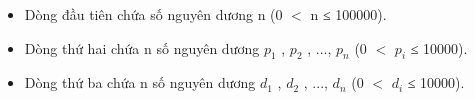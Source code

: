 \begin{itemize}
	\item     Dòng đầu tiên chứa số nguyên dương n (0 $<$ n ≤ 100000).   
	\item     Dòng thứ hai chứa n số nguyên dương $p_{1}$    , $p_{2}$    , ..., $p_{n}$    (0 $<$ $p_{i}$    ≤ 10000).   
	\item     Dòng thứ ba chứa n số nguyên dương $d_{1}$    , $d_{2}$    , ..., $d_{n}$    (0 $<$ $d_{i}$    ≤ 10000).   
\end{itemize}